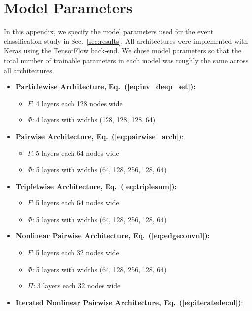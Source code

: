 \documentclass[aps,prd,twocolumn,superscriptaddress,floatfix,longbibliography,preprintnumbers,nofootinbib]{revtex4-1} %
\DeclareRobustCommand{\Sec}[1]{Sec.~\ref{sec:#1}}
\DeclareRobustCommand{\Eq}[1]{Eq.~(\ref{eq:#1})}
\newcounter{para}
\begin{document}
    
\section{Model Parameters}
\label{app:params}

In this appendix, we specify the model parameters used for the event classification study in \Sec{results}.
%
All architectures were implemented with {\sc Keras} \cite{chollet2015keras} using the {\sc TensorFlow} \cite{Abadi:2016kic} back-end.
%
We chose model parameters so that the total number of trainable parameters in each model was roughly the same across all architectures.

\begin{itemize}
  \item \textbf{Particlewise Architecture, \Eq{inv_deep_set}:} 
    \begin{itemize}
      \item \(F\):  4 layers each 128 nodes wide
      \item \(\Phi\):  4 layers with widths (128, 128, 128, 64)
    \end{itemize}
  \item \textbf{Pairwise Architecture, \Eq{pairwise_arch}}: 
    \begin{itemize}
      \item \(F\): 5 layers each 64 nodes wide
      \item \(\Phi\): 5 layers with widths (64, 128, 256, 128, 64)
    \end{itemize}
  \item \textbf{Tripletwise Architecture, \Eq{triplesum}:}\begin{itemize}
    \item \(F\):  5 layers each \(64\) nodes wide
    \item \(\Phi\):  5 layers with widths (64, 128, 256, 128, 64)
  \end{itemize}
    \item \textbf{Nonlinear Pairwise Architecture, \Eq{edgeconvnl}:}
      \begin{itemize}
        \item \(F\):  5 layers each 32 nodes wide
        \item \(\Phi\):  5 layers with widths (64, 128, 256, 128, 64)
        \item \(\Pi\):  3 layers each 32 nodes wide
      \end{itemize}
    \item \textbf{Iterated Nonlinear Pairwise Architecture, \Eq{iteratedecnl}}: 

\end{itemize}
\end{document}
